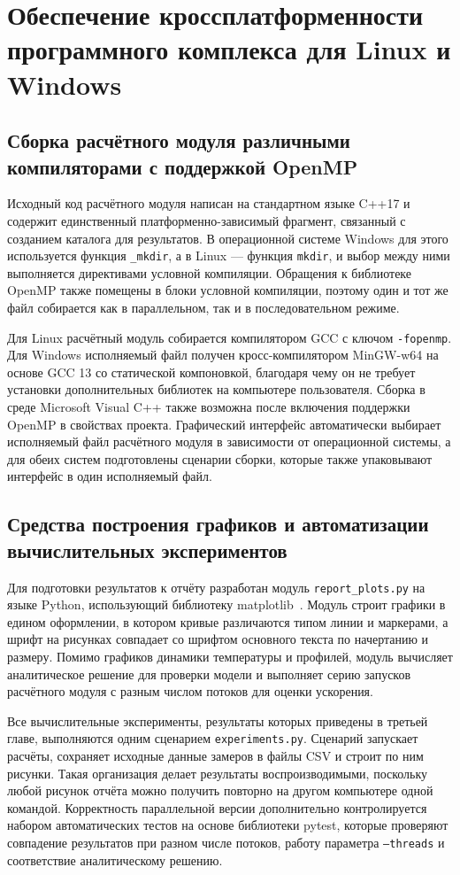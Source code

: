 \section{Обеспечение кроссплатформенности программного комплекса для Linux и Windows}

\subsection{Сборка расчётного модуля различными компиляторами с поддержкой OpenMP}

Исходный код расчётного модуля написан на стандартном языке C++17 и содержит единственный платформенно-зависимый фрагмент, связанный с созданием каталога для результатов. В операционной системе Windows для этого используется функция \texttt{\_mkdir}, а в Linux --- функция \texttt{mkdir}, и выбор между ними выполняется директивами условной компиляции. Обращения к библиотеке OpenMP также помещены в блоки условной компиляции, поэтому один и тот же файл собирается как в параллельном, так и в последовательном режиме.

Для Linux расчётный модуль собирается компилятором GCC с ключом \texttt{-fopenmp}. Для Windows исполняемый файл получен кросс-компилятором MinGW-w64 на основе GCC 13 со статической компоновкой, благодаря чему он не требует установки дополнительных библиотек на компьютере пользователя. Сборка в среде Microsoft Visual C++ также возможна после включения поддержки OpenMP в свойствах проекта. Графический интерфейс автоматически выбирает исполняемый файл расчётного модуля в зависимости от операционной системы, а для обеих систем подготовлены сценарии сборки, которые также упаковывают интерфейс в один исполняемый файл.

\subsection{Средства построения графиков и автоматизации вычислительных экспериментов}

Для подготовки результатов к отчёту разработан модуль \texttt{report\_plots.py} на языке Python, использующий библиотеку matplotlib~\cite{bisong2019matplotlib}. Модуль строит графики в едином оформлении, в котором кривые различаются типом линии и маркерами, а шрифт на рисунках совпадает со шрифтом основного текста по начертанию и размеру. Помимо графиков динамики температуры и профилей, модуль вычисляет аналитическое решение для проверки модели и выполняет серию запусков расчётного модуля с разным числом потоков для оценки ускорения.

Все вычислительные эксперименты, результаты которых приведены в третьей главе, выполняются одним сценарием \texttt{experiments.py}. Сценарий запускает расчёты, сохраняет исходные данные замеров в файлы CSV и строит по ним рисунки. Такая организация делает результаты воспроизводимыми, поскольку любой рисунок отчёта можно получить повторно на другом компьютере одной командой. Корректность параллельной версии дополнительно контролируется набором автоматических тестов на основе библиотеки pytest, которые проверяют совпадение результатов при разном числе потоков, работу параметра \texttt{--threads} и соответствие аналитическому решению.
